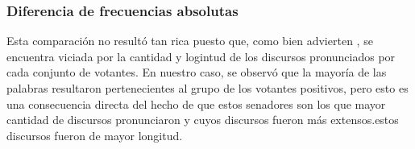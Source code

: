 \subsubsection{Diferencia de frecuencias absolutas}
Esta comparaci\'on no result\'o tan rica puesto que, como bien advierten
\cite{monroe2008fightin}, se encuentra viciada por la cantidad y logintud
de los discursos pronunciados por cada conjunto de votantes. En nuestro caso,
se observ\'o que la mayor\'ia de las palabras resultaron pertenecientes al grupo
de los votantes positivos, pero esto es una consecuencia directa del hecho
de que estos senadores son los que mayor cantidad de discursos pronunciaron y
cuyos discursos fueron m\'as extensos.estos discursos fueron de mayor
longitud.
